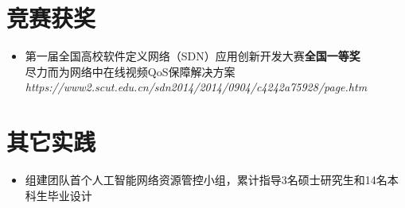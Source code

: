 \documentclass{resume}
\begin{document}

\section{\faThumbsOUp 竞赛获奖}
\begin{itemize}[parsep=0.2ex]
  \item 第一届全国高校软件定义网络（SDN）应用创新开发大赛\textbf{全国一等奖}
  \\\faChevronRight 尽力而为网络中在线视频QoS保障解决方案\\ \textit{https://www2.scut.edu.cn/sdn2014/2014/0904/c4242a75928/page.htm}
\end{itemize}
\section{\faComments 其它实践}
\begin{itemize}[parsep=0.2ex]
    \item 组建团队首个人工智能网络资源管控小组，累计指导3名硕士研究生和14名本科生毕业设计
\end{itemize}
\end{document}
